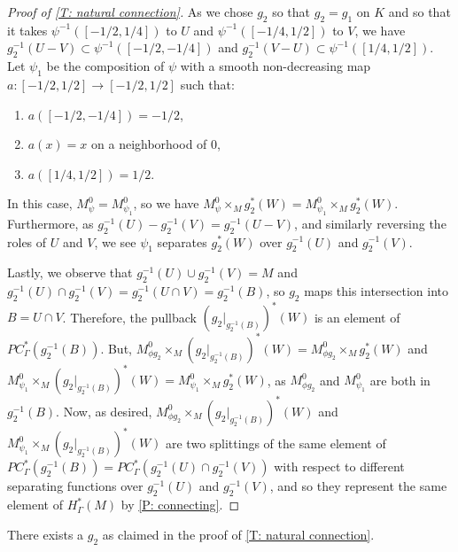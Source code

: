 \begin{proof}[Proof of \cref{T: natural connection}]
	As we chose $g_2$ so that $g_2 = g_1$ on $K$ and so that it takes $\psi^{-1}([-1/2,1/4])$ to $U$ and $\psi^{-1}([-1/4,1/2])$ to $V$, we have $g_2^{-1}(U  - V) \subset \psi^{-1}([-1/2,-1/4])$ and $g_2^{-1}(V  - U) \subset \psi^{-1}([1/4,1/2])$.
	Let $\psi_1$ be the composition of $\psi$ with a smooth non-decreasing map $a \colon [-1/2,1/2] \to [-1/2,1/2]$ such that:
	\begin{enumerate}
		\item $a([-1/2,-1/4]) = -1/2$,
		\item $a(x)=x$ on a neighborhood of $0$,
		\item $a([1/4,1/2]) = 1/2$.
	\end{enumerate}
	In this case, $M^0_\psi = M^0_{\psi_1}$, so we have $M^0_\psi \times_M g_2^*(W) = M^0_{\psi_1} \times_M g_2^*(W)$.
	Furthermore, as $g_2^{-1}(U) - g_2^{-1}(V) = g_2^{-1}(U - V)$, and similarly reversing the roles of $U$ and $V$, we see $\psi_1$ separates $g_2^*(W)$ over $g_2^{-1}(U)$ and $g_2^{-1}(V)$.

	Lastly, we observe that $g_2^{-1}(U) \cup g_2^{-1}(V) = M$ and $g_2^{-1}(U) \cap g_2^{-1}(V) = g_2^{-1} (U \cap V) = g_2^{-1}(B)$, so $g_2$ maps this intersection into $B = U \cap V$.
	Therefore, the pullback $(g_2|_{g_2^{-1} (B)})^* (W)$ is an element of $PC^*_\Gamma(g_2^{-1} (B))$.
	But, $M^0_{\phi g_2} \times_M	(g_2|_{g_2^{-1} (B)})^* (W) = M^0_{\phi g_2} \times_M g_2^*(W)$ and $M^0_{\psi_1} \times_M (g_2|_{g_2^{-1} (B)})^* (W) = M^0_{\psi_1} \times_M g_2^*(W)$, as $M^0_{\phi g_2}$ and $M^0_{\psi_1}$ are both in $g_2^{-1} (B)$.
	Now, as desired, $M^0_{\phi g_2} \times_M	(g_2|_{g_2^{-1} (B)})^* (W)$ and $M^0_{\psi_1} \times_M (g_2|_{g_2^{-1} (B)})^* (W)$ are two splittings of the same element of $PC^*_\Gamma(g_2^{-1} (B)) = PC^*_\Gamma(g_2^{-1}(U) \cap g_2^{-1}(V)) $ with respect to different separating functions over $g_2^{-1}(U)$ and $g_2^{-1}(V)$, and so they represent the same element of $H^*_\Gamma(M)$ by \cref{P: connecting}.
\end{proof}

\begin{lemma}
	There exists a $g_2$ as claimed in the proof of \cref{T: natural connection}.
\end{lemma}

